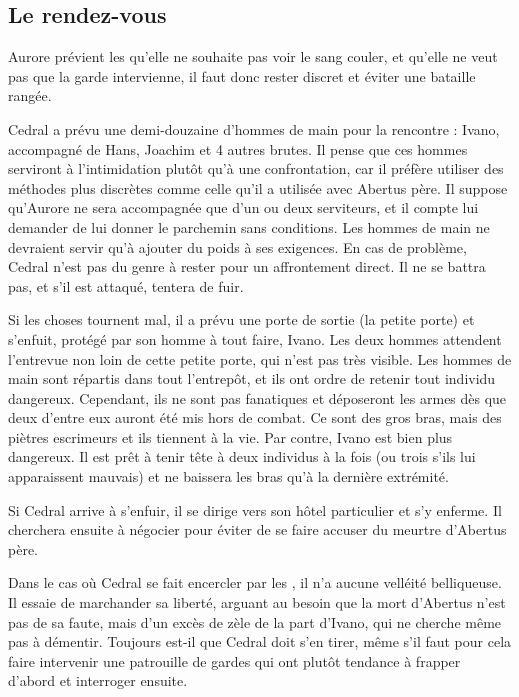 \documentclass[a4paper,10pt,openany]{book}
\begin{document}
\begin{multicols}{2}
\subsection{Le rendez-vous}
Aurore prévient les \PJs qu’elle ne souhaite pas voir le sang couler, et qu’elle ne veut pas que la garde intervienne, il faut donc rester discret et
éviter une bataille rangée.\par Cedral a prévu une demi-douzaine d’hommes de main pour la rencontre : Ivano, accompagné de Hans, Joachim et 4 autres
brutes. Il pense que ces hommes serviront à l’intimidation plutôt qu’à une confrontation, car il préfère utiliser des méthodes plus discrètes comme
celle qu’il a utilisée avec Abertus père. Il suppose qu’Aurore ne sera accompagnée que d’un ou deux serviteurs, et il compte lui demander de lui
donner le parchemin sans conditions. Les hommes de main ne devraient servir qu’à ajouter du poids à ses exigences. En cas de problème, Cedral n’est
pas du genre à rester pour un affrontement direct. Il ne se battra pas, et s’il est attaqué, tentera de fuir.\par Si les choses tournent mal, il a
prévu une porte de sortie (la petite porte) et s’enfuit, protégé par son homme à tout faire, Ivano. Les deux hommes attendent l’entrevue non loin de
cette petite porte, qui n’est pas très visible. Les hommes de main sont répartis dans tout l’entrepôt, et ils ont ordre de retenir tout individu
dangereux. Cependant, ils ne sont pas fanatiques et déposeront les armes dès que deux d’entre eux auront été mis hors de combat. Ce sont des gros
bras, mais des piètres escrimeurs et ils tiennent à la vie. Par contre, Ivano est bien plus dangereux. Il est prêt à tenir tête à deux individus à la
fois (ou trois s’ils lui apparaissent mauvais) et ne baissera les bras qu’à la dernière extrémité.\par Si Cedral arrive à s’enfuir, il se dirige vers
son hôtel particulier et s’y enferme. Il cherchera ensuite à négocier pour éviter de se faire accuser du meurtre d’Abertus père.\par Dans le cas où
Cedral se fait encercler par les \PJs, il n’a aucune velléité belliqueuse. Il essaie de marchander sa liberté, arguant au besoin que la mort d’Abertus
n’est pas de sa faute, mais d’un excès de zèle de la part d’Ivano, qui ne cherche même pas à démentir. Toujours est-il que Cedral doit s’en tirer,
même s’il faut pour cela faire intervenir une patrouille de gardes qui ont plutôt tendance à frapper d’abord et interroger ensuite.

\end{multicols}
\end{document}

